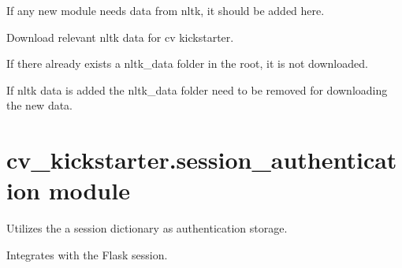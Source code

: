 \documentclass[letterpaper,10pt,english]{sphinxmanual}
\begin{document}
If any new module needs data from nltk, it should be added here.

\begin{fulllineitems}
\label{cv_kickstarter:cv_kickstarter.nltk_data_downloader.download}
Download relevant nltk data for cv kickstarter.

If there already exists a nltk\_data folder in the root, it is not
downloaded.

If nltk data is added the nltk\_data folder need to be removed for
downloading the new data.

\end{fulllineitems}



\section{cv\_kickstarter.session\_authentication module}
\label{cv_kickstarter:module-cv_kickstarter.session_authentication}\label{cv_kickstarter:cv-kickstarter-session-authentication-module}
Utilizes the a session dictionary as authentication storage.

Integrates with the Flask session.
\end{document}
